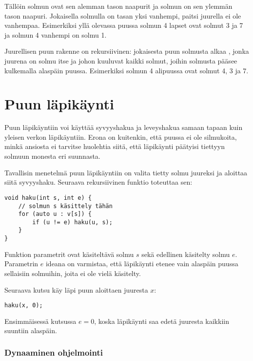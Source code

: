 
Tällöin solmun 
ovat sen alemman tason naapurit
ja solmun 
on sen ylemmän tason naapuri.
Jokaisella solmulla on tasan yksi vanhempi,
paitsi juurella ei ole vanhempaa.
Esimerkiksi yllä olevassa puussa solmun 4
lapset ovat solmut 3 ja 7 ja solmun 4 vanhempi on solmu 1.


Juurellisen puun rakenne on rekursiivinen:
jokaisesta puun solmusta alkaa ,
jonka juurena on solmu itse ja johon kuuluvat
kaikki solmut, joihin solmusta pääsee kulkemalla alaspäin puussa.
Esimerkiksi solmun 4 alipuussa
ovat solmut 4, 3 ja 7.

\section{Puun läpikäynti}

Puun läpikäyntiin voi käyttää syvyyshakua ja
leveyshakua samaan
tapaan kuin yleisen verkon läpikäyntiin.
Erona on kuitenkin, että puussa ei ole silmukoita,
minkä ansiosta ei tarvitse huolehtia siitä,
että läpikäynti päätyisi tiettyyn
solmuun monesta eri suunnasta.

Tavallisin menetelmä puun läpikäyntiin on
valita tietty solmu juureksi ja aloittaa
siitä syvyyshaku.
Seuraava rekursiivinen funktio toteuttaa sen:

\begin{lstlisting}
void haku(int s, int e) {
    // solmun s käsittely tähän
    for (auto u : v[s]) {
        if (u != e) haku(u, s);
    }
}
\end{lstlisting}

Funktion parametrit ovat käsiteltävä solmu $s$
sekä edellinen käsitelty solmu $e$.
Parametrin $e$ ideana on varmistaa, että
läpikäynti etenee vain alaspäin puussa
sellaisiin solmuihin, joita ei ole vielä käsitelty.

Seuraava kutsu käy läpi puun aloittaen juuresta $x$:

\begin{lstlisting}
haku(x, 0);
\end{lstlisting}

Ensimmäisessä kutsussa $e=0$, koska läpikäynti
saa edetä juuresta kaikkiin suuntiin alaspäin.

\subsubsection{Dynaaminen ohjelmointi}

